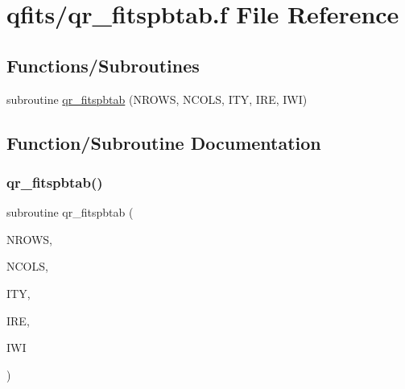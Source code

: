 \hypertarget{qr__fitspbtab_8f}{}\section{qfits/qr\+\_\+fitspbtab.f File Reference}
\label{qr__fitspbtab_8f}
\subsection*{Functions/\+Subroutines}
\begin{DoxyCompactItemize}
\item 
subroutine \hyperlink{qr__fitspbtab_8f_a73e1775410ce13d6266f778490916b15}{qr\+\_\+fitspbtab} (N\+R\+O\+WS, N\+C\+O\+LS, I\+TY, I\+RE, I\+WI)
\end{DoxyCompactItemize}


\subsection{Function/\+Subroutine Documentation}
\mbox{\label{qr__fitspbtab_8f_a73e1775410ce13d6266f778490916b15}} 
\subsubsection{\texorpdfstring{qr\+\_\+fitspbtab()}{qr\_fitspbtab()}}
{\footnotesize\ttfamily subroutine qr\+\_\+fitspbtab (\begin{DoxyParamCaption}\item[{integer}]{N\+R\+O\+WS,  }\item[{integer}]{N\+C\+O\+LS,  }\item[{integer, dimension(ncols)}]{I\+TY,  }\item[{integer, dimension(ncols)}]{I\+RE,  }\item[{integer, dimension(ncols)}]{I\+WI }\end{DoxyParamCaption})}

